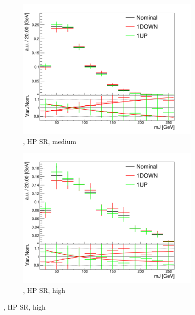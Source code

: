 \begin{figure}[!htbp]
  \centering
  \begin{subfigure}{.5\textwidth}
    \includegraphics[width=\textwidth]{chapters/6.vhbb_boosted/figs/0L_Whf_2tag1pfat0jet_250_400ptv_SR_noaddbjetsr_mJIncl_SysMUR.pdf}
    \caption{\Whf, HP SR, medium \pTV}
    \label{fig:Vjets_SysMUR_sub1}
  \end{subfigure}%
  \hfill
  \begin{subfigure}{.5\textwidth}
    \includegraphics[width=\textwidth]{chapters/6.vhbb_boosted/figs/0L_Whf_2tag1pfat0jet_400ptv_SR_noaddbjetsr_mJIncl_SysMUR.pdf}
    \caption{\Whf, HP SR, high \pTV}
    \label{fig:Vjets_SysMUR_sub2}

\end{subfigure}
\end{figure}
